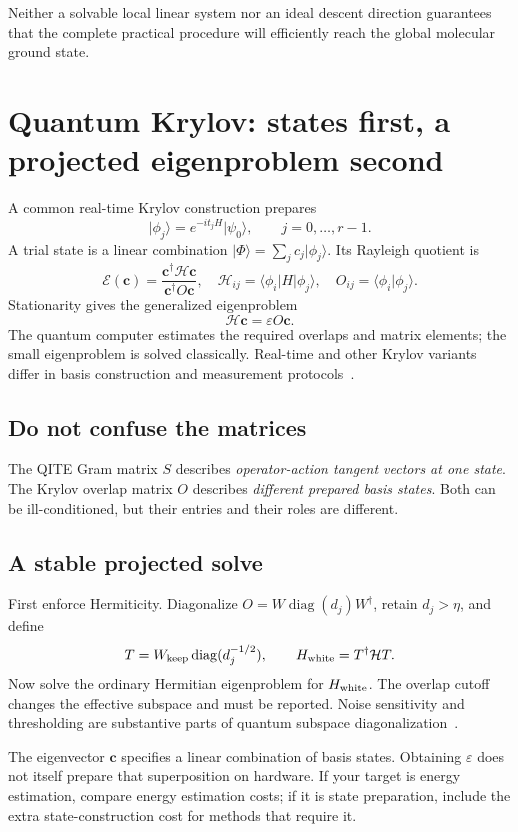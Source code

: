 \documentclass[11pt,a4paper]{article}
\newcommand{\ket}[1]{\lvert #1\rangle}
\newcommand{\bra}[1]{\langle #1\rvert}
\newcommand{\braket}[2]{\langle #1\vert #2\rangle}
\newcommand{\lesson}[2]{\clearpage\section{#1}\label{#2}}
\begin{document}
Neither a solvable local linear system nor an ideal descent direction guarantees that the complete practical procedure will efficiently reach the global molecular ground state.

\lesson{Quantum Krylov: states first, a projected eigenproblem second}{sec:krylov}
A common real-time Krylov construction prepares
\[
\ket{\phi_j}=e^{-it_jH}\ket{\psi_0},\qquad j=0,\ldots,r-1.
\]
A trial state is a linear combination $\ket{\Phi}=\sum_j c_j\ket{\phi_j}$. Its Rayleigh quotient is
\[
\mathcal E(\bm c)=\frac{\bm c^\dagger\mathcal H\bm c}{\bm c^\dagger O\bm c},\quad
\mathcal H_{ij}=\bra{\phi_i}H\ket{\phi_j},\quad
O_{ij}=\braket{\phi_i}{\phi_j}.
\]
Stationarity gives the generalized eigenproblem
\begin{equation}
\boxed{\mathcal H\bm c=\varepsilon O\bm c.}
\label{eq:krylov}
\end{equation}
The quantum computer estimates the required overlaps and matrix elements; the small eigenproblem is solved classically. Real-time and other Krylov variants differ in basis construction and measurement protocols~\cite{cortes}.

\subsection*{Do not confuse the matrices}
The QITE Gram matrix $S$ describes \emph{operator-action tangent vectors at one state}. The Krylov overlap matrix $O$ describes \emph{different prepared basis states}. Both can be ill-conditioned, but their entries and their roles are different.

\subsection*{A stable projected solve}
First enforce Hermiticity. Diagonalize $O=W\operatorname{diag}(d_j)W^\dagger$, retain $d_j>\eta$, and define
\[
T=W_{\rm keep}\operatorname{diag}(d_j^{-1/2}),\qquad
H_{\rm white}=T^\dagger\mathcal H T.
\]
Now solve the ordinary Hermitian eigenproblem for $H_{\rm white}$. The overlap cutoff changes the effective subspace and must be reported. Noise sensitivity and thresholding are substantive parts of quantum subspace diagonalization~\cite{epperly}.

\begin{caution}
The eigenvector $\bm c$ specifies a linear combination of basis states. Obtaining $\varepsilon$ does not itself prepare that superposition on hardware. If your target is energy estimation, compare energy estimation costs; if it is state preparation, include the extra state-construction cost for methods that require it.
\end{caution}
\end{document}
